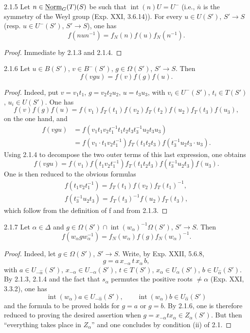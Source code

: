 \begin{lemma}{2.1.5}\label{XXIII.2.1.5}
Let $n\in\underline{\mathrm{Norm}}_G(T)(S)$ be such that $\operatorname{int}(n)U=U^-$ (i.e., $\bar n$ is the symmetry of the Weyl group (Exp. XXI, 3.6.14)). For every $u\in U(S')$, $S'\to S$ (resp. $u\in U^-(S')$, $S'\to S$), one has
\[
f(nun^{-1})=f_N(n)f(u)f_N(n^{-1}).
\]
\end{lemma}
\begin{proof}
Immediate by 2.1.3 and 2.1.4.
\end{proof}
\begin{lemma}{2.1.6}\label{XXIII.2.1.6}
Let $u\in B(S')$, $v\in B^-(S')$, $g\in\Omega(S')$, $S'\to S$. Then
\[
f(vgu)=f(v)f(g)f(u).
\]
\end{lemma}
\begin{proof}
Indeed, put $v=v_1t_1$, $g=v_2t_2u_2$, $u=t_3u_3$, with $v_i\in U^-(S')$, $t_i\in T(S')$, $u_i\in U(S')$. One has
\[
f(v)f(g)f(u)=f(v_1)f_T(t_1)f(v_2)f_T(t_2)f(u_2)f_T(t_3)f(u_3),
\]
on the one hand, and
\[
\begin{aligned}
f(vgu)&=f(v_1t_1v_2t_1^{-1}t_1t_2t_3t_3^{-1}u_2t_3u_3)\\
&=f(v_1\cdot t_1v_2t_1^{-1})f_T(t_1t_2t_3)f(t_3^{-1}u_2t_3\cdot u_3).
\end{aligned}
\]
Using 2.1.4 to decompose the two outer terms of this last expression, one obtains
\[
f(vgu)=f(v_1)f(t_1v_2t_1^{-1})f_T(t_1t_2t_3)f(t_3^{-1}u_2t_3)f(u_3).
\]
One is then reduced to the obvious formulas
\[
\begin{gathered}
f(t_1v_2t_1^{-1})=f_T(t_1)f(v_2)f_T(t_1)^{-1},\\
f(t_3^{-1}u_2t_3)=f_T(t_3)^{-1}f(u_2)f_T(t_3),
\end{gathered}
\]
which follow from the definition of f and from 2.1.3.
\end{proof}
\begin{lemma}{2.1.7}\label{XXIII.2.1.7}
Let $\alpha\in\Delta$ and $g\in\Omega(S')\cap\operatorname{int}(w_\alpha)^{-1}\Omega(S')$, $S'\to S$. Then
\[
f(w_\alpha gw_\alpha^{-1})=f_N(w_\alpha)f(g)f_N(w_\alpha)^{-1}.
\]
\end{lemma}
\begin{proof}
Indeed, let $g\in\Omega(S')$, $S'\to S$. Write, by Exp. XXII, 5.6.8,
\[
g=a\,x_{-\alpha}\,t\,x_\alpha\,b,
\]
with $a\in U_{-\widehat\alpha}(S')$, $x_{-\alpha}\in U_{-\alpha}(S')$, $t\in T(S')$, $x_\alpha\in U_\alpha(S')$, $b\in U_{\widehat\alpha}(S')$. By 2.1.3, 2.1.4 and the fact that $s_\alpha$ permutes the positive roots $\ne\alpha$ (\cf Exp. XXI, 3.3.2), one has
\[
\operatorname{int}(w_\alpha)a\in U_{-\widehat\alpha}(S'),\qquad
\operatorname{int}(w_\alpha)b\in U_{\widehat\alpha}(S')
\]
and the formula to be proved holds for $g=a$ or $g=b$. By 2.1.6, one is therefore reduced to proving the desired assertion when $g=x_{-\alpha}t x_\alpha\in Z_\alpha(S')$. But then ``everything takes place in $Z_\alpha$'' and one concludes by condition (ii) of 2.1.
\end{proof}
